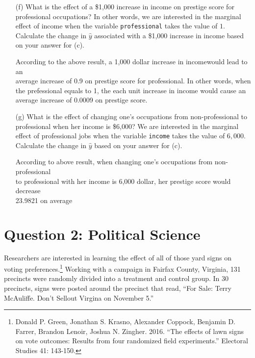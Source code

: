 \documentclass[12pt,letterpaper]{article}
\begin{document}
\begin{enumerate}
	\item [(f)]
	What is the effect of a \$1,000 increase in income on prestige score for professional occupations? In other words, we are interested in the marginal effect of income when the variable \texttt{professional} takes the value of $1$. Calculate the change in $\hat{y}$ associated with a \$1,000 increase in income based on your answer for (c).
			 
					\vspace{2cm}
				\begin{itemize}
        According to the above result, a 1,000 dollar increase in incomewould lead to an\\
         average increase of 0.9  on prestige score for professional.  In other words, when \\
         the prefessional equals to 1,  the each unit increase in income would cause an average
         increase of 0.0009 on prestige score.\\
         
			\end{itemize}
	\vspace{10cm}
	
	
	\item [(g)]
	What is the effect of changing one's occupations from non-professional to professional when her income is \$6,000? We are interested in the marginal effect of professional jobs when the variable \texttt{income} takes the value of $6,000$. Calculate the change in $\hat{y}$ based on your answer for (c).
				 
					\begin{itemize}
		According to above result, when changing one’s occupations from non-professional\\
		 to professional with her income is 6,000 dollar, her prestige score would decrease\\ 23.9821 on average\\
	\end{itemize}
\end{enumerate}

\newpage

\section*{Question 2: Political Science}
\vspace{.25cm}
\noindent 	Researchers are interested in learning the effect of all of those yard signs on voting preferences.\footnote{Donald P. Green, Jonathan	S. Krasno, Alexander Coppock, Benjamin D. Farrer,	Brandon Lenoir, Joshua N. Zingher. 2016. ``The effects of lawn signs on vote outcomes: Results from four randomized field experiments.'' Electoral Studies 41: 143-150. } Working with a campaign in Fairfax County, Virginia, 131 precincts were randomly divided into a treatment and control group. In 30 precincts, signs were posted around the precinct that read, ``For Sale: Terry McAuliffe. Don't Sellout Virgina on November 5.'' \\
\end{document}
